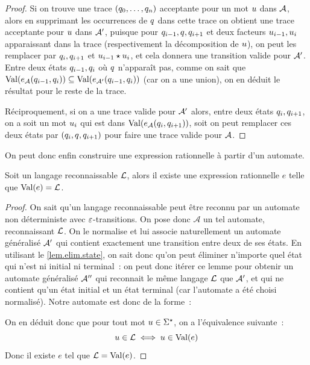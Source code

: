 \begin{proof}
  Si on trouve une trace $(q_{0},\ldots,q_{n})$ acceptante pour un mot
  $u$ dans $\mathcal{A}$, alors en supprimant les occurrences de $q_{}$ dans
  cette trace on obtient une trace acceptante pour $u$ dans $\mathcal{A}'$,
  puisque pour $q_{i-1},q_{},q_{i+1}$ et deux facteurs
  $u_{i-1},u_i$ apparaissant dans la trace (respectivement la
  décomposition de $u$), on peut les remplacer par
  $q_{i},q_{i+1}$ et $u_{i-1}\mathbin{\star} u_i$, et cela donnera une
  transition valide pour $\mathcal{A}'$. Entre deux états $q_{i-1},q_{i}$ où
  $q_{}$ n'apparaît pas, comme on sait que
  $\operatorname{Val}(e_{\mathcal{A}}(q_{i-1},q_{i}))\subseteq
  \operatorname{Val}(e_{\mathcal{A}'}(q_{i-1},q_{i}))$
  (car on a une union), on en déduit le résultat pour le reste de la trace.

  Réciproquement, si on a une trace valide pour $\mathcal{A}'$ alors, entre deux
  états $q_{i},q_{i+1}$, on a soit un mot $u_i$ qui est dans
  $\operatorname{Val}(e_{\mathcal{A}}(q_{i},q_{i+1}))$, soit on peut remplacer ces deux
  états par $(q_{i},q_{},q_{i+1})$ pour faire une trace valide pour
  $\mathcal{A}$.
\end{proof}

\noindent
On peut donc enfin construire une expression rationnelle à partir d'un automate.

\begin{proposition}
  Soit un langage reconnaissable $\mathcal L$, alors il existe une expression
  rationnelle $e$ telle que $\operatorname{Val}(e) = \mathcal L$.
\end{proposition}

\begin{proof}
  On sait qu'un langage reconnaissable peut être reconnu par un automate non
  déterministe avec $\varepsilon$-transitions. On pose donc $\mathcal A$ un tel
  automate, reconnaissant $\mathcal L$. On le normalise et lui associe naturellement
  un automate généralisé $\mathcal{A}'$ qui contient exactement une transition entre
  deux de ses états. En utilisant le \cref{lem.elim.state}, on sait donc qu'on
  peut éliminer n'importe quel état qui n'est ni initial ni terminal~: on peut
  donc itérer ce lemme pour obtenir un automate généralisé $\mathcal{A}''$ qui
  reconnait le même langage $\mathcal L$ que $\mathcal{A}'$, et qui ne contient qu'un
  état initial et un état terminal (car l'automate a été choisi normalisé).
  Notre automate est donc de la forme~:
  \begin{figure}[ht]
    \centering
  \end{figure}
  
  On en déduit donc que pour tout mot $u \in \Sigma^{\star}$, on a l'équivalence
  suivante~:
  \[u \in \mathcal L \iff u \in \operatorname{Val}(e)\]
  Donc il existe $e$ tel que $\mathcal L = \operatorname{Val}(e)$.
\end{proof}

